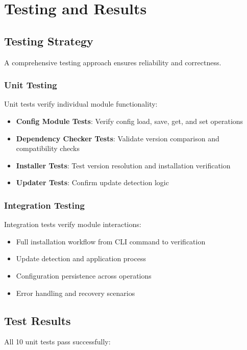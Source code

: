 \documentclass[12pt,a4paper]{report}
\begin{document}
\chapter{Testing and Results}
\section{Testing Strategy}
A comprehensive testing approach ensures reliability and correctness.

\subsection{Unit Testing}
Unit tests verify individual module functionality:
\begin{itemize}
    \item \textbf{Config Module Tests}: Verify config load, save, get, and set operations
    \item \textbf{Dependency Checker Tests}: Validate version comparison and compatibility checks
    \item \textbf{Installer Tests}: Test version resolution and installation verification
    \item \textbf{Updater Tests}: Confirm update detection logic
\end{itemize}

\subsection{Integration Testing}
Integration tests verify module interactions:
\begin{itemize}
    \item Full installation workflow from CLI command to verification
    \item Update detection and application process
    \item Configuration persistence across operations
    \item Error handling and recovery scenarios
\end{itemize}

\section{Test Results}
All 10 unit tests pass successfully:
\end{document}

